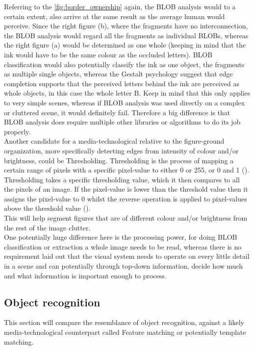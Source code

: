 \documentclass{article}
\newcommand{\goodcite}[1]{ {(\cite{#1})}}
\begin{document}
Referring to the \autoref{fig:border_ownership} again, the BLOB analysis would to a certain extent, also arrive at the same result as the average human would perceive. Since the right figure (b), where the fragments have no interconnection, the BLOB analysis would regard all the fragments as individual BLOBs, whereas the right figure (a) would be determined as one whole (keeping in mind that the ink would have to be the same colour as the occluded letters). BLOB classification would also potentially classify the ink as one object, the fragments as multiple single objects, whereas the Gestalt psychology suggest that edge completion supports that the perceived letters behind the ink are perceived as whole objects, in this case the whole letter B. Keep in mind that this only applies to very simple scenes, whereas if BLOB analysis was used directly on a complex or cluttered scene, it would definitely fail. Therefore a big difference is that BLOB analysis does require multiple other libraries or algorithms to do its job properly.\medskip\\

Another candidate for a media-technological relative to the figure-ground organization, more specifically detecting edges from intensity of colour and/or brightness, could be Thresholding. Thresholding is the process of mapping a certain range of pixels with a specific pixel-value to either 0 or 255, or 0 and 1\goodcite{IP}. Thresholding takes a specific thresholding value, which it then compares to all the pixels of an image. If the pixel-value is lower than the threshold value then it assigns the pixel-value to 0 whilst the reverse operation is applied to pixel-values above the threshold value\goodcite{IP}.\\This will help segment figures that are of different colour and/or brightness from the rest of the image clutter.\medskip \\

One potentially huge difference here is the processing power, for doing BLOB classification or extraction a whole image needs to be read, whereas there is no requirement laid out that the visual system needs to operate on every little detail in a scene and can potentially through top-down information, decide how much and what information is important enough to process.


\subsection{Object recognition}
This section will compare the resemblance of object recognition, against a likely media-technological counterpart called Feature matching or potentially template matching.
\end{document}

